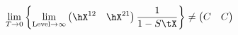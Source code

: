 \begin{equation} %
  \lim_{T\to 0} \left\{\lim_{\text{Level} \to \infty}
  \left(
    \begin{matrix}
      \hX^{12} & \hX^{21}
    \end{matrix}
  \right)
  \frac{1}{1-S \tX} \right\}
  \ne 
  \left( 
    \begin{matrix}
       C & C
    \end{matrix}
   \right)
\end{equation} 
